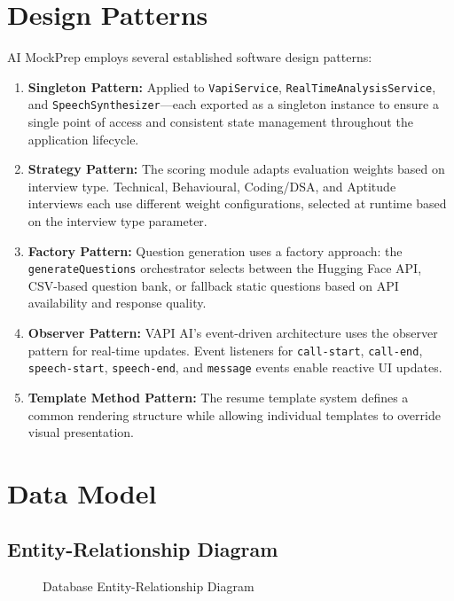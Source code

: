 \documentclass[12pt,a4paper,oneside]{report}
\begin{document}
\section{Design Patterns}

AI MockPrep employs several established software design patterns:

\begin{enumerate}
  \item \textbf{Singleton Pattern:} Applied to \texttt{VapiService}, \texttt{RealTimeAnalysisService}, and \texttt{SpeechSynthesizer}---each exported as a singleton instance to ensure a single point of access and consistent state management throughout the application lifecycle.

  \item \textbf{Strategy Pattern:} The scoring module adapts evaluation weights based on interview type. Technical, Behavioural, Coding/DSA, and Aptitude interviews each use different weight configurations, selected at runtime based on the interview type parameter.

  \item \textbf{Factory Pattern:} Question generation uses a factory approach: the \texttt{generateQuestions} orchestrator selects between the Hugging Face API, CSV-based question bank, or fallback static questions based on API availability and response quality.

  \item \textbf{Observer Pattern:} VAPI AI's event-driven architecture uses the observer pattern for real-time updates. Event listeners for \texttt{call-start}, \texttt{call-end}, \texttt{speech-start}, \texttt{speech-end}, and \texttt{message} events enable reactive UI updates.

  \item \textbf{Template Method Pattern:} The resume template system defines a common rendering structure while allowing individual templates to override visual presentation.
\end{enumerate}


\section{Data Model}

\subsection{Entity-Relationship Diagram}

\begin{figure}[H]
\centering
{}
\caption{Database Entity-Relationship Diagram}
\label{fig:er_diagram_db}
\end{figure}
\end{document}
